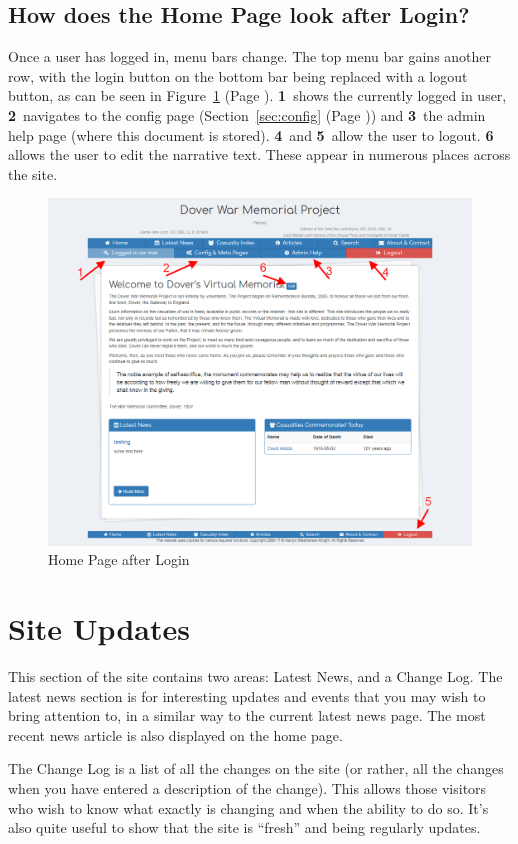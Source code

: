 \documentclass[12pt]{article}
\newcommand{\marker}[1]{\color{red}\textbf{#1}\color{black}}
\newcommand{\myref}[1]{\ref{#1} {\scriptsize(Page \pageref{#1})}}
\begin{document}
\newpage
\FloatBarrier
\subsection{How does the Home Page look after Login?}
Once a user has logged in, menu bars change. The top menu bar gains another row, with the login button on the bottom bar being replaced with a logout button, as can be seen in Figure~\myref{fig:home_login}. \marker{1}\ shows the currently logged in user, \marker{2}\ navigates to the config page (Section~\myref{sec:config}) and \marker{3}\ the admin help page (where this document is stored). \marker{4}\ and \marker{5}\ allow the user to logout. \marker{6} allows the user to edit the narrative text. These appear in numerous places across the site.

\begin{figure}[h]
  \centering
 \includegraphics[width=.9\textwidth]{pics/home_login.png}
	\caption{Home Page after Login}\label{fig:home_login}
\end{figure}

\newpage
\FloatBarrier
\section{Site Updates}\label{sec:siteUpdate}
This section of the site contains two areas: Latest News, and a Change Log. The latest news section is for interesting updates and events that you may wish to bring attention to, in a similar way to the current latest news page. The most recent news article is also displayed on the home page.

The Change Log is a list of all the changes on the site (or rather, all the changes when you have entered a description of the change). This allows those visitors who wish to know what exactly is changing and when the ability to do so. It's also quite useful to show that the site is ``fresh'' and being regularly updates.
\end{document}
